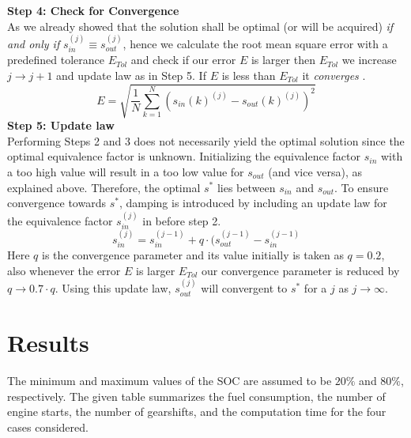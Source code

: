 \documentclass[conference]{IEEEtran}
\begin{document}
\noindent\textbf{Step 4: Check for Convergence}\\
As we already showed that the solution shall be optimal (or will be acquired) \emph{if and only if} $s_{in}^{(j)} \equiv s_{out}^{(j)}$, hence we calculate the root mean square error with a predefined tolerance $E_{Tol}$ and check if our error $E$ is larger then $E_{Tol}$ we increase $j \rightarrow j+1$ and update law as in Step 5. If $E$ is less than $E_{Tol}$ it \emph{converges}
.\begin{equation}
    E = \sqrt{\frac{1}{N}\sum_{k=1}^N(s_{in}(k)^{(j)} - s_{out}(k)^{(j)})^2}
\end{equation}
\noindent\textbf{Step 5: Update law}\\
Performing Steps 2 and 3 does not necessarily yield the optimal solution since the optimal equivalence factor is unknown. Initializing the equivalence factor $s_{in}$ with a too high value will result in a too low value for $s_{out}$ (and vice versa), as explained above. Therefore, the optimal $s^*$ lies between $s_{in}$ and $s_{out}$. To ensure convergence towards $s^*$, damping is introduced by including an update law for the equivalence factor $s_{in}^{(j)}$ in before step 2.
\begin{equation}
    s_{in}^{(j)} = s_{in}^{(j-1)} + q\cdot (s_{out}^{(j-1)} - s_{in}^{(j-1)}
\end{equation}
Here $q$ is the convergence parameter and its value initially is taken as $q = 0.2$, also whenever the error $E$ is larger $E_{Tol}$ our convergence parameter is reduced by $q \rightarrow 0.7 \cdot q$. Using this update law, $s_{out}^{(j)}$ will convergent to $s^*$ for a $j$ as $j \rightarrow \infty$.

\section{\textbf{Results}}
The minimum and maximum values of the SOC are assumed to be $20\%$ and $80\%$, respectively. 
The given table summarizes the fuel consumption, the number of engine starts, the number of gearshifts, and the computation time for the four cases considered.
\end{document}

